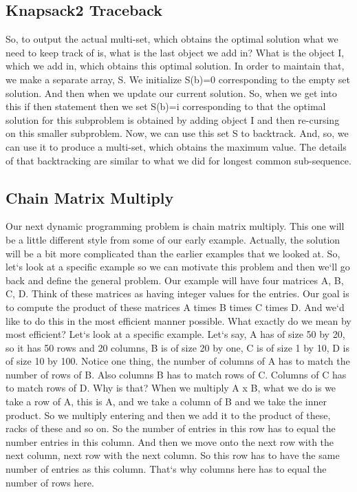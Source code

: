 \subsection{Knapsack2  Traceback}
So, to output the actual multi-set, which obtains the optimal solution what we need to keep track of is, what is the last object we add in? What is the object I, which we add in, which obtains this optimal solution.
In order to maintain that, we make a separate array, S\@.
We initialize S(b)=0 corresponding to the empty set solution.
And then when we update our current solution.
So, when we get into this if then statement then we set S(b)=i corresponding to that the optimal solution for this subproblem is obtained by adding object I and then re-cursing on this smaller subproblem.
Now, we can use this set S to backtrack.
And, so, we can use it to produce a multi-set, which obtains the maximum value.
The details of that backtracking are similar to what we did for longest common sub-sequence.

\subsection{Chain Matrix Multiply}
Our next dynamic programming problem is chain matrix multiply.
This one will be a little different style from some of our early example.
Actually, the solution will be a bit more complicated than the earlier examples that we looked at.
So, let`s look at a specific example so we can motivate this problem and then we`ll go back and define the general problem.
Our example will have four matrices A, B, C, D\@.
Think of these matrices as having integer values for the entries.
Our goal is to compute the product of these matrices A times B times C times D\@.
And we`d like to do this in the most efficient manner possible.
What exactly do we mean by most efficient? Let`s look at a specific example.
Let`s say, A has of size 50 by 20, so it has 50 rows and 20 columns, B is of size 20 by one, C is of size 1 by 10, D is of size 10 by 100.
Notice one thing, the number of columns of A has to match the number of rows of B\@.
Also columns B has to match rows of C\@.
Columns of C has to match rows of D\@.
Why is that? When we multiply A x B, what we do is we take a row of A, this is A, and we take a column of B and we take the inner product.
So we multiply entering and then we add it to the product of these, racks of these and so on.
So the number of entries in this row has to equal the number entries in this column.
And then we move onto the next row with the next column, next row with the next column.
So this row has to have the same number of entries as this column.
That`s why columns here has to equal the number of rows here.


